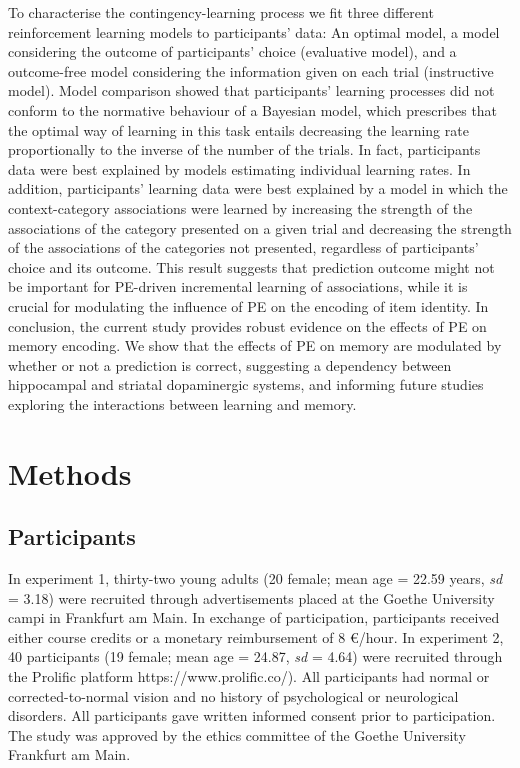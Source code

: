 \documentclass[a4paper,12pt]{article}
\begin{document}
To characterise the contingency-learning process we fit three different reinforcement learning models to participants' data: An optimal model, a model considering the outcome of participants' choice (evaluative model), and a outcome-free model considering the information given on each trial (instructive model). Model comparison showed that participants' learning processes did not conform to the normative behaviour of a Bayesian model, which prescribes that the optimal way of learning in this task entails decreasing the learning rate proportionally to the inverse of the number of the trials. In fact, participants data were best explained by models estimating individual learning rates. In addition, participants' learning data were best explained by a model in which the context-category associations were learned by increasing the strength of the associations of the category presented on a given trial and decreasing the strength of the associations of the categories not presented, regardless of participants' choice and its outcome. This result suggests that prediction outcome might not be important for PE-driven incremental learning of associations, while it is crucial for modulating the influence of PE on the encoding of item identity. 
In conclusion, the current study provides robust evidence on the effects of PE on memory encoding. We show that the effects of PE on memory are modulated by whether or not a prediction is correct, suggesting a dependency between hippocampal and striatal dopaminergic systems, and informing future studies exploring the interactions between learning and memory. 


\section{Methods}
\subsection{Participants}
In experiment 1, thirty-two young adults (20 female; mean age = 22.59 years, \textit{sd} = 3.18) were recruited through advertisements placed at the Goethe University campi in Frankfurt am Main. In exchange of participation, participants received either course credits or a monetary reimbursement of 8 €/hour. 
In experiment 2, 40 participants (19 female; mean age = 24.87, \textit{sd} = 4.64) were recruited through the Prolific platform https://www.prolific.co/). All participants had normal or corrected-to-normal vision and no history of psychological or neurological disorders. All participants gave written informed consent prior to participation. The study was approved by the ethics committee of the Goethe University Frankfurt am Main. 
\end{document}
